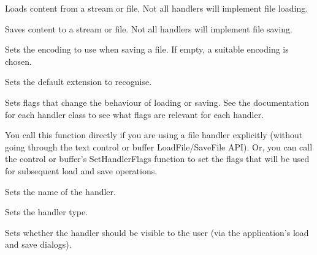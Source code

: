 Loads content from a stream or file. Not all handlers will implement file loading.

\label{wxrichtextfilehandlersavefile}



Saves content to a stream or file. Not all handlers will implement file saving.

\label{wxrichtextfilehandlersetencoding}


Sets the encoding to use when saving a file. If empty, a suitable encoding is chosen.

\label{wxrichtextfilehandlersetextension}


Sets the default extension to recognise.

\label{wxrichtextfilehandlersetflags}


Sets flags that change the behaviour of loading or saving. See the documentation for each
handler class to see what flags are relevant for each handler.

You call this function directly if you are using a file handler explicitly (without
going through the text control or buffer LoadFile/SaveFile API). Or, you can
call the control or buffer's SetHandlerFlags function to set the flags that will
be used for subsequent load and save operations.

\label{wxrichtextfilehandlersetname}


Sets the name of the handler.

\label{wxrichtextfilehandlersettype}


Sets the handler type.

\label{wxrichtextfilehandlersetvisible}


Sets whether the handler should be visible to the user (via the application's load and save
dialogs).

